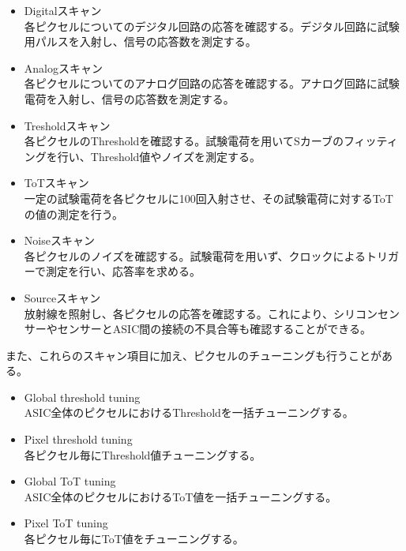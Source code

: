 \begin{itemize}
  \item Digitalスキャン \\
  各ピクセルについてのデジタル回路の応答を確認する。デジタル回路に試験用パルスを入射し、信号の応答数を測定する。
  \item Analogスキャン \\
  各ピクセルについてのアナログ回路の応答を確認する。アナログ回路に試験電荷を入射し、信号の応答数を測定する。
  \item Tresholdスキャン \\
  各ピクセルのThresholdを確認する。試験電荷を用いてSカーブのフィッティングを行い、Threshold値やノイズを測定する。
  \item ToTスキャン \\
  一定の試験電荷を各ピクセルに100回入射させ、その試験電荷に対するToTの値の測定を行う。
  \item Noiseスキャン \\
  各ピクセルのノイズを確認する。試験電荷を用いず、クロックによるトリガーで測定を行い、応答率を求める。
  \item Sourceスキャン \\
  放射線を照射し、各ピクセルの応答を確認する。これにより、シリコンセンサーやセンサーとASIC間の接続の不具合等も確認することができる。
\end{itemize}

また、これらのスキャン項目に加え、ピクセルのチューニングも行うことがある。
\begin{itemize}
  \item Global threshold tuning \\
  ASIC全体のピクセルにおけるThresholdを一括チューニングする。
  \item Pixel threshold tuning \\
  各ピクセル毎にThreshold値チューニングする。
  \item Global ToT tuning \\
  ASIC全体のピクセルにおけるToT値を一括チューニングする。
  \item Pixel ToT tuning \\
  各ピクセル毎にToT値をチューニングする。
\end{itemize}


